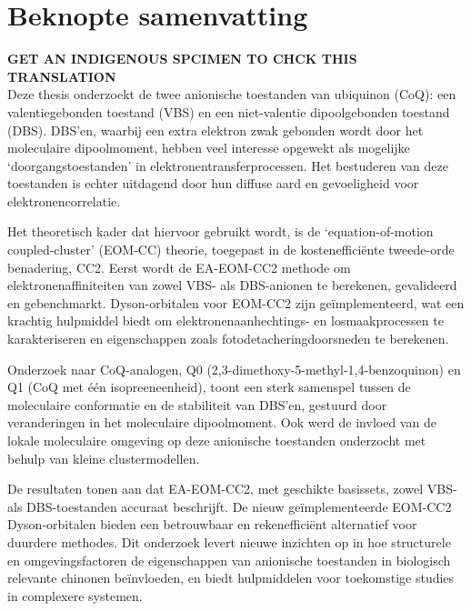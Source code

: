 \chapter*{Beknopte samenvatting}


\textbf{GET AN INDIGENOUS SPCIMEN TO CHCK THIS TRANSLATION}\\
Deze thesis onderzoekt de twee anionische toestanden van ubiquinon (CoQ): een valentiegebonden toestand (VBS) en een niet-valentie dipoolgebonden toestand (DBS). DBS'en, waarbij een extra elektron zwak gebonden wordt door het moleculaire dipoolmoment, hebben veel interesse opgewekt als mogelijke `doorgangstoestanden' in elektronentransferprocessen. Het bestuderen van deze toestanden is echter uitdagend door hun diffuse aard en gevoeligheid voor elektronencorrelatie.

Het theoretisch kader dat hiervoor gebruikt wordt, is de `equation-of-motion coupled-cluster' (EOM-CC) theorie, toegepast in de kostenefficiënte tweede-orde benadering, CC2. Eerst wordt de EA-EOM-CC2 methode om elektronenaffiniteiten van zowel VBS- als DBS-anionen te berekenen, gevalideerd en gebenchmarkt. Dyson-orbitalen voor EOM-CC2 zijn geïmplementeerd, wat een krachtig hulpmiddel biedt om elektronenaanhechtings- en losmaakprocessen te karakteriseren en eigenschappen zoals fotodetacheringdoorsneden te berekenen.

Onderzoek naar CoQ-analogen, Q0 (2,3-dimethoxy-5-methyl-1,4-benzoquinon) en Q1 (CoQ met één isopreeneenheid), toont een sterk samenspel tussen de moleculaire conformatie en de stabiliteit van DBS'en, gestuurd door veranderingen in het moleculaire dipoolmoment. Ook werd de invloed van de lokale moleculaire omgeving op deze anionische toestanden onderzocht met behulp van kleine clustermodellen.

De resultaten tonen aan dat EA-EOM-CC2, met geschikte basissets, zowel VBS- als DBS-toestanden accuraat beschrijft. De nieuw ge{\"i}mplementeerde EOM-CC2 Dyson-orbitalen bieden een betrouwbaar en rekenefficiënt alternatief voor duurdere methodes. Dit onderzoek levert nieuwe inzichten op in hoe structurele en omgevingsfactoren de eigenschappen van anionische toestanden in biologisch relevante chinonen beïnvloeden, en biedt hulpmiddelen voor toekomstige studies in complexere systemen.

\cleardoublepage


